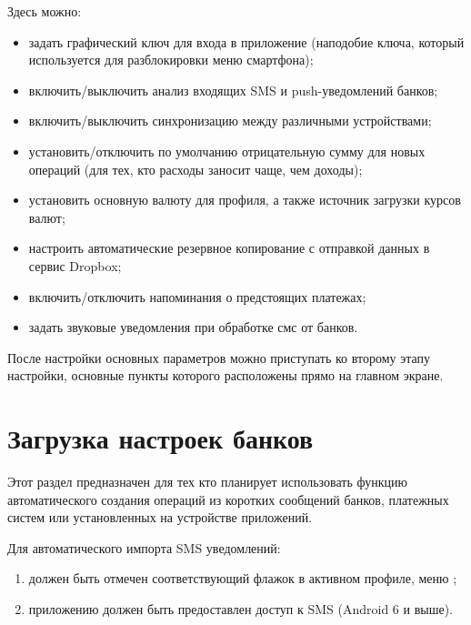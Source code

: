 \documentclass[a4paper,10pt,russian]{sphinxmanual}
\begin{document}
\noindent{}

Здесь можно:
\begin{itemize}
\item {} 
задать графический ключ для входа в приложение (наподобие ключа, который используется для разблокировки меню смартфона);

\item {} 
включить/выключить анализ входящих SMS и push-уведомлений банков;

\item {} 
включить/выключить синхронизацию между различными устройствами;

\item {} 
установить/отключить по умолчанию отрицательную сумму для новых операций (для тех, кто расходы заносит чаще, чем доходы);

\item {} 
установить основную валюту для профиля, а также источник загрузки курсов валют;

\item {} 
настроить автоматические резервное копирование с отправкой данных в сервис Dropbox;

\item {} 
включить/отключить напоминания о предстоящих платежах;

\item {} 
задать звуковые уведомления при обработке смс от банков.

\end{itemize}

После настройки основных параметров можно приступать ко второму этапу настройки, основные пункты которого
расположены прямо на главном экране.


\section{Загрузка настроек банков}
\label{\detokenize{getting-started:id3}}
Этот раздел предназначен для тех кто планирует использовать функцию автоматического создания операций из коротких сообщений банков,
платежных систем или установленных на устройстве приложений.

Для автоматического импорта SMS уведомлений:
\begin{enumerate}
\def\theenumi{\arabic{enumi}}
\def\labelenumi{\theenumi .}
\makeatletter\def\p@enumii{\p@enumi \theenumi .}\makeatother
\item {} 
должен быть отмечен соответствующий флажок в активном профиле, меню ;

\item {} 
приложению должен быть предоставлен доступ к SMS (Android 6 и выше).

\end{enumerate}
\end{document}
